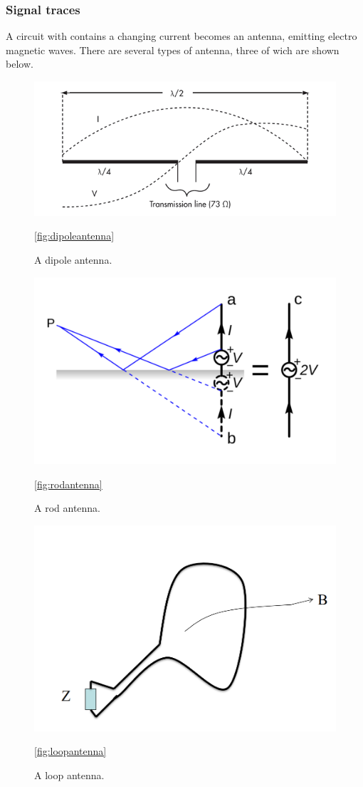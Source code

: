 \subsubsection*{Signal traces}
A circuit with contains a changing current becomes an antenna, emitting electro
magnetic waves. There are several types of antenna, three of wich are shown
below. 
\begin{figure}[H]
\centering
\includegraphics{./figures/FIG_dipoleantenna.png}
\caption{A dipole antenna.}
\ref{fig:dipoleantenna}
\end{figure}
\begin{figure}[H]
\centering
\includegraphics[scale=0.3]{./figures/FIG_rodantenna.png}
\caption{A rod antenna.}
\ref{fig:rodantenna}
\end{figure}
\begin{figure}[H]
\centering
\includegraphics[scale=0.3]{./figures/FIG_loopantenna.png}
\caption{A loop antenna.}
\ref{fig:loopantenna}
\end{figure}
